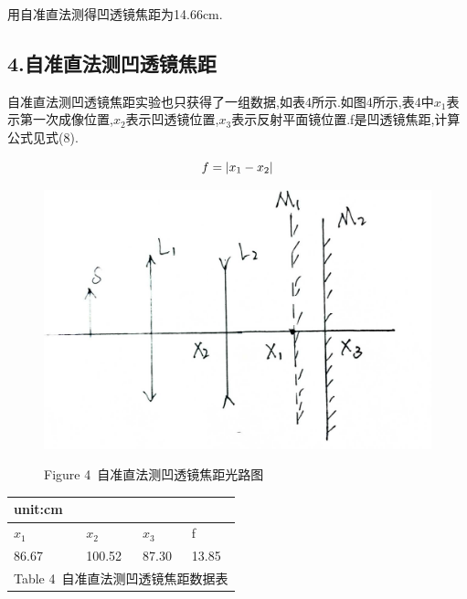 \documentclass[a4paper,10pt,notitlepage]{report}
\begin{document}
	用自准直法测得凹透镜焦距为14.66cm.

\subsection*{4.自准直法测凹透镜焦距}

	自准直法测凹透镜焦距实验也只获得了一组数据,如表4所示.如图4所示,表4中$x_1$表示第一次成像位置,$x_2$表示凹透镜位置,$x_3$表示反射平面镜位置.f是凹透镜焦距,计算公式见式(8).
	
\begin{equation}
	f=|x_1 - x_2| \\
\end{equation}

\begin{figure}
\centering

	\includegraphics[scale=0.1]{zza.jpg}
	\begin{center}
		\scriptsize Figure 4\ 自准直法测凹透镜焦距光路图
	\end{center}

\end{figure}

\begin{table}[htbp]
\centering
\begin{tabular}{|l|l|l|l|}

	\multicolumn{1}{l}{\scriptsize unit:cm} \\
	\hline
	$x_1$ & $x_2$ & $x_3$ & f \\
	\hline
	86.67 & 100.52 & 87.30 & 13.85 \\
	\hline
	\multicolumn{4}{c}{\scriptsize Table 4\ 自准直法测凹透镜焦距数据表} \\

\end{tabular}
\end{table}
			
\end{document}
